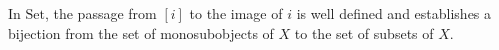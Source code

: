 In $\text{Set}$, the passage from $[i]$ to the image of $i$ is well defined and establishes a bijection from the set of monosubobjects of $X$ to the set of subsets of $X$.
